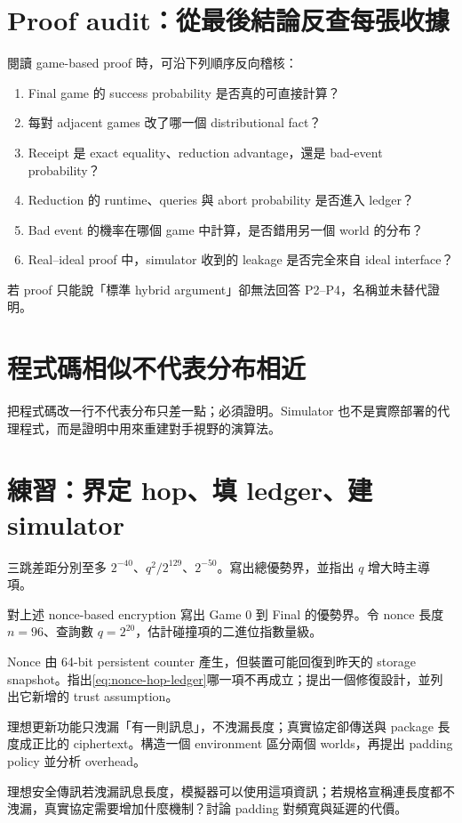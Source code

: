 \documentclass[11pt,a4paper,oneside,openany]{book}
\begin{document}
\section{Proof audit：從最後結論反查每張收據}
閱讀 game-based proof 時，可沿下列順序反向稽核：
\begin{enumerate}[label=\textbf{P\arabic*.}]
\item Final game 的 success probability 是否真的可直接計算？
\item 每對 adjacent games 改了哪一個 distributional fact？
\item Receipt 是 exact equality、reduction advantage，還是 bad-event probability？
\item Reduction 的 runtime、queries 與 abort probability 是否進入 ledger？
\item Bad event 的機率在哪個 game 中計算，是否錯用另一個 world 的分布？
\item Real--ideal proof 中，simulator 收到的 leakage 是否完全來自 ideal interface？
\end{enumerate}
若 proof 只能說「標準 hybrid argument」卻無法回答 P2--P4，名稱並未替代證明。

\section{程式碼相似不代表分布相近}
\begin{misconception}
把程式碼改一行不代表分布只差一點；必須證明。Simulator 也不是實際部署的代理程式，而是證明中用來重建對手視野的演算法。
\end{misconception}

\section{練習：界定 hop、填 ledger、建 simulator}
\begin{exercise}
三跳差距分別至多 $2^{-40}$、$q^2/2^{129}$、$2^{-50}$。寫出總優勢界，並指出 $q$ 增大時主導項。
\end{exercise}
\begin{exercise}
對上述 nonce-based encryption 寫出 Game 0 到 Final 的優勢界。令 nonce 長度 $n=96$、查詢數 $q=2^{20}$，估計碰撞項的二進位指數量級。
\end{exercise}
\begin{exercise}
Nonce 由 64-bit persistent counter 產生，但裝置可能回復到昨天的 storage snapshot。指出\cref{eq:nonce-hop-ledger}哪一項不再成立；提出一個修復設計，並列出它新增的 trust assumption。
\end{exercise}
\begin{exercise}
理想更新功能只洩漏「有一則訊息」，不洩漏長度；真實協定卻傳送與 package 長度成正比的 ciphertext。構造一個 environment 區分兩個 worlds，再提出 padding policy 並分析 overhead。
\end{exercise}
\begin{exercise}
理想安全傳訊若洩漏訊息長度，模擬器可以使用這項資訊；若規格宣稱連長度都不洩漏，真實協定需要增加什麼機制？討論 padding 對頻寬與延遲的代價。
\end{exercise}
\end{document}
